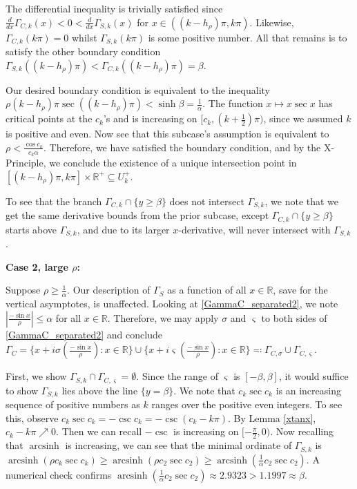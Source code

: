 \documentclass{amsart}
\theoremstyle{plain}
\numberwithin{theorem}{section}
\DeclareMathOperator{\arcsinh}{arcsinh}
\theoremstyle{definition}
\theoremstyle{remark}
\theoremstyle{brakets}
\newcommand{\R}{\mathbb{R}}
\begin{document}
The differential inequality is trivially satisfied since $\frac{d}{dx}\Gamma_{C,k}(x) < 0 < \frac{d}{dx}\Gamma_{S,k}(x)$ for $x \in ((k-h_\rho)\pi,k\pi)$. Likewise, $\Gamma_{C,k}(k\pi) = 0$ whilst $\Gamma_{S,k}(k\pi)$ is some positive number. All that remains is to satisfy the other boundary condition $\Gamma_{S,k}((k-h_\rho)\pi) < \Gamma_{C,k}((k-h_\rho)\pi) = \beta$. 

Our desired boundary condition is equivalent to the inequality $\rho (k-h_\rho)\pi \sec((k-h_\rho)\pi) < \sinh \beta = \frac{1}{\alpha}$. The function $x \mapsto x\sec x$ has critical points at the $c_k$'s and is increasing on $[c_k,(k + \frac{1}{2})\pi)$, since we assumed $k$ is positive and even. Now see that this subcase's assumption is equivalent to $\rho < \frac{\cos c_k}{c_k\alpha}$. Therefore, we have satisfied the boundary condition, and by the X-Principle, we conclude the existence of a unique intersection point in $[(k-h_\rho)\pi,k\pi] \times \R^+ \subseteq U_k^+$. 

To see that the branch $\Gamma_{C,k} \cap \{y \geq \beta\}$ does not intersect $\Gamma_{S,k}$, we note that we get the same derivative bounds from the prior subcase, except $\Gamma_{C,k} \cap \{y \geq \beta\}$ starts above $\Gamma_{S,k}$, and due to its larger $x$-derivative, will never intersect with $\Gamma_{S,k}$.



\noindent \textbf{Case 2, large $\rho$:}

Suppose $\rho \geq \frac{1}{\alpha}$. Our description of $\Gamma_S$ as a function of all $x \in \R$, save for the vertical asymptotes, is unaffected. Looking at \eqref{GammaC_separated2}, we note $|\frac{-\sin x}{\rho}| \leq \alpha$ for all $x \in \R$. Therefore, we may apply $\sigma$ and $\varsigma$ to both sides of \eqref{GammaC_separated2} and conclude $\Gamma_C = \{x + i \sigma(\frac{-\sin x}{\rho}): x \in \R\} \cup \{x + i\varsigma(\frac{-\sin x}{\rho}): x \in \R\} \eqqcolon \Gamma_{C,\sigma} \cup \Gamma_{C,\varsigma}$.

First, we show $\Gamma_{S,k} \cap \Gamma_{C,\varsigma} = \emptyset$. Since the range of $\varsigma$ is $[-\beta,\beta]$, it would suffice to show $\Gamma_{S,k}$ lies above the line $\{y = \beta\}$. We note that $c_k\sec c_k$ is an increasing sequence of positive numbers as $k$ ranges over the positive even integers. To see this, observe $c_k\sec c_k = -\csc c_k = -\csc(c_k - k\pi)$. By Lemma \ref{xtanx}, $c_k - k\pi \nearrow 0$. Then we can recall $-\csc$ is increasing on $[-\frac{\pi}{2},0)$. Now recalling that $\arcsinh$ is increasing, we can see that the minimal ordinate of $\Gamma_{S,k}$ is $\arcsinh(\rho c_k \sec c_k) \geq \arcsinh(\rho c_2 \sec c_2) \geq \arcsinh(\frac{1}{\alpha}c_2\sec c_2 )$. A numerical check confirms $\arcsinh (\frac{1}{\alpha} c_2\sec c_2) \approx 2.9323 > 1.1997 \approx \beta$.
\end{document}

